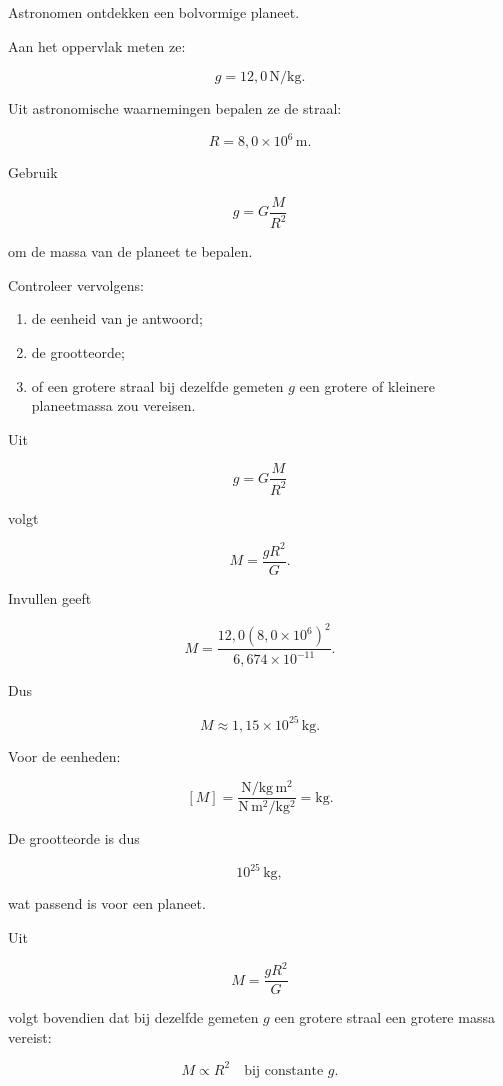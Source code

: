 \documentclass{ximera}
\begin{document}
\begin{oefening}{\oefG}

Astronomen ontdekken een bolvormige planeet.

Aan het oppervlak meten ze:

\[
g=12{,}0\,\mathrm{N/kg}.
\]

Uit astronomische waarnemingen bepalen ze de straal:

\[
R=8{,}0\times10^6\,\mathrm m.
\]

Gebruik

\[
g=G\frac{M}{R^2}
\]

om de massa van de planeet te bepalen.

Controleer vervolgens:

\begin{enumerate}
  \item de eenheid van je antwoord;
  \item de grootteorde;
  \item of een grotere straal bij dezelfde gemeten $g$ een grotere of
        kleinere planeetmassa zou vereisen.
\end{enumerate}


\begin{oplossing}

Uit

\[
g=G\frac{M}{R^2}
\]

volgt

\[
M=\frac{gR^2}{G}.
\]

Invullen geeft

\[
M
=
\frac{
12{,}0(8{,}0\times10^6)^2
}{
6{,}674\times10^{-11}
}.
\]

Dus

\[
\boxed{
M\approx1{,}15\times10^{25}\,\mathrm{kg}.
}
\]

Voor de eenheden:

\[
[M]
=
\frac{
\mathrm{N/kg}\,\mathrm{m^2}
}{
\mathrm{N\,m^2/kg^2}
}
=
\mathrm{kg}.
\]

De grootteorde is dus

\[
\boxed{10^{25}\,\mathrm{kg}},
\]

wat passend is voor een planeet.

Uit

\[
M=\frac{gR^2}{G}
\]

volgt bovendien dat bij dezelfde gemeten $g$ een grotere straal een
grotere massa vereist:

\[
\boxed{
M\propto R^2
\quad\text{bij constante }g.
}
\]

\end{oplossing}

\end{oefening}
\end{document}
